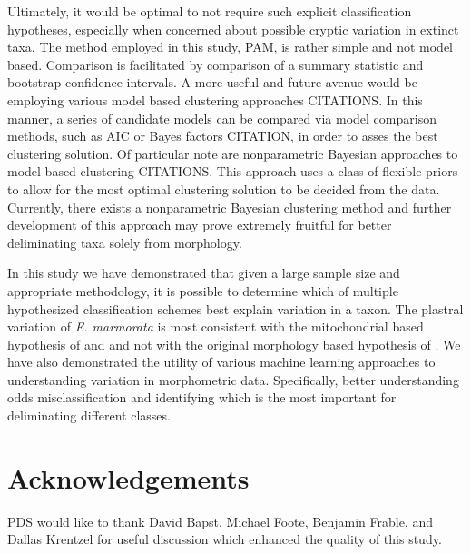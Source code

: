 \documentclass[12pt]{article}\usepackage{graphicx, color}
\begin{document}
Ultimately, it would be optimal to not require such explicit classification hypotheses, especially when concerned about possible cryptic variation in extinct taxa. The method employed in this study, PAM, is rather simple and not model based. Comparison is facilitated by comparison of a summary statistic and bootstrap confidence intervals. A more useful and future avenue would be employing various model based clustering approaches CITATIONS. In this manner, a series of candidate models can be compared via model comparison methods, such as AIC or Bayes factors CITATION, in order to asses the best clustering solution. Of particular note are nonparametric Bayesian approaches to model based clustering CITATIONS. This approach uses a class of flexible priors to allow for the most optimal clustering solution to be decided from the data. Currently, there exists a nonparametric Bayesian clustering method and further development of this approach may prove extremely fruitful for better deliminating taxa solely from morphology.


In this study we have demonstrated that given a large sample size and appropriate methodology, it is possible to determine which of multiple hypothesized classification schemes best explain variation in a taxon. The plastral variation of \textit{E. marmorata} is most consistent with the mitochondrial based hypothesis of \citet{Spinks2005} and \citet{Spinks2010} and not with the original morphology based hypothesis of \citet{Seeliger1945}. We have also demonstrated the utility of various machine learning approaches to understanding variation in morphometric data. Specifically, better understanding odds misclassification and identifying which is the most important for deliminating different classes.

\section*{Acknowledgements}
PDS would like to thank David Bapst, Michael Foote, Benjamin Frable, and Dallas Krentzel for useful discussion which enhanced the quality of this study.



\end{document}
